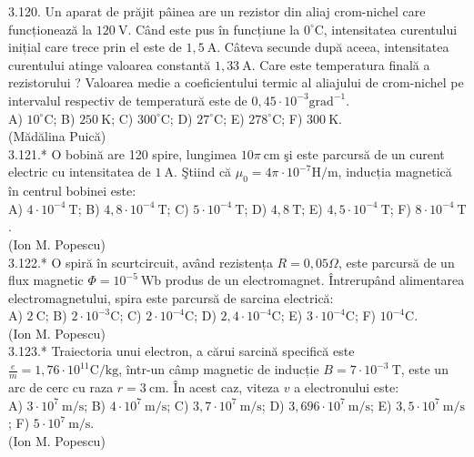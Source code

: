 \documentclass[10pt]{article}
\begin{document}
3.120. Un aparat de prăjit pâinea are un rezistor din aliaj crom-nichel care funcționează la $120 \mathrm{~V}$. Când este pus în funcțiune la $0^{\circ} \mathrm{C}$, intensitatea curentului inițial care trece prin el este de $1,5 \mathrm{~A}$. Câteva secunde după aceea, intensitatea curentului atinge valoarea constantă $1,33 \mathrm{~A}$. Care este temperatura finală a rezistorului ? Valoarea medie a coeficientului termic al aliajului de crom-nichel pe intervalul respectiv de temperatură este de $0,45 \cdot 10^{-3} \mathrm{grad}^{-1}$.\\ A) $10^{\circ} \mathrm{C}$; B) $250 \mathrm{~K}$; C) $300^{\circ} \mathrm{C}$; D) $27^{\circ} \mathrm{C}$; E) $278^{\circ} \mathrm{C}$; F) $300 \mathrm{~K}$.\\ (Mădălina Puică)\\

3.121.* O bobină are 120 spire, lungimea $10 \pi \mathrm{~cm}$ şi este parcursă de un curent electric cu intensitatea de $1 \mathrm{~A}$. Ştiind că $\mu_{0}=4 \pi \cdot 10^{-7} \mathrm{H} / \mathrm{m}$, inducția magnetică în centrul bobinei este:\\ A) $4 \cdot 10^{-4} \mathrm{~T}$; B) $4,8 \cdot 10^{-4} \mathrm{~T}$; C) $5 \cdot 10^{-4} \mathrm{~T}$; D) $4,8 \mathrm{~T}$; E) $4,5 \cdot 10^{-4} \mathrm{~T}$; F) $8 \cdot 10^{-4} \mathrm{~T}$.\\ (Ion M. Popescu)\\

3.122.* O spiră în scurtcircuit, având rezistența $R=0,05 \Omega$, este parcursă de un flux magnetic $\Phi=10^{-5} \mathrm{~Wb}$ produs de un electromagnet. Întrerupând alimentarea electromagnetului, spira este parcursă de sarcina electrică:\\ A) $2 \mathrm{~C}$; B) $2 \cdot 10^{-3} \mathrm{C}$; C) $2 \cdot 10^{-4} \mathrm{C}$; D) $2,4 \cdot 10^{-4} \mathrm{C}$; E) $3 \cdot 10^{-4} \mathrm{C}$; F) $10^{-4} \mathrm{C}$.\\ (Ion M. Popescu)\\

3.123.* Traiectoria unui electron, a cărui sarcină specifică este $\frac{e}{m}=1,76 \cdot 10^{11} \mathrm{C} / \mathrm{kg}$, într-un câmp magnetic de inducție $B=7 \cdot 10^{-3} \mathrm{~T}$, este un arc de cerc cu raza $r=3 \mathrm{~cm}$. În acest caz, viteza $v$ a electronului este:\\ A) $3 \cdot 10^{7} \mathrm{~m} / \mathrm{s}$; B) $4 \cdot 10^{7} \mathrm{~m} / \mathrm{s}$; C) $3,7 \cdot 10^{7} \mathrm{~m} / \mathrm{s}$; D) $3,696 \cdot 10^{7} \mathrm{~m} / \mathrm{s}$; E) $3,5 \cdot 10^{7} \mathrm{~m} / \mathrm{s}$; F) $5 \cdot 10^{7} \mathrm{~m} / \mathrm{s}$.\\ (Ion M. Popescu)\\
\end{document}
